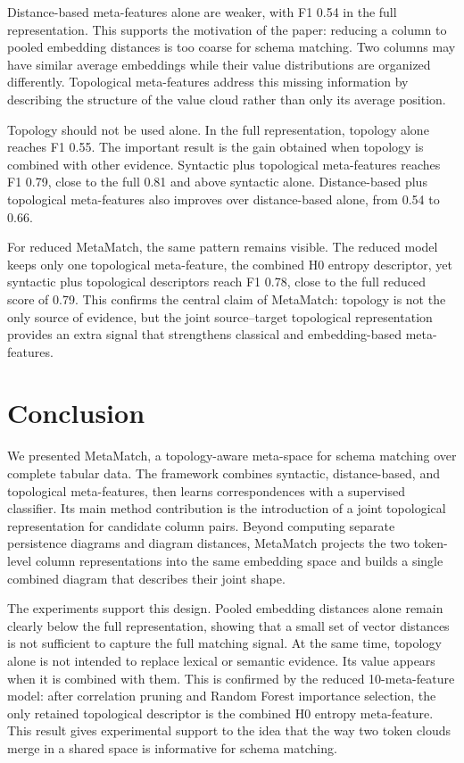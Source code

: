 \documentclass[sigconf, nonacm]{acmart}
\begin{document}
Distance-based meta-features alone are weaker, with F1 0.54 in the full representation. This supports the motivation of the paper: reducing a column to pooled embedding distances is too coarse for schema matching. Two columns may have similar average embeddings while their value distributions are organized differently. Topological meta-features address this missing information by describing the structure of the value cloud rather than only its average position.

Topology should not be used alone. In the full representation, topology alone reaches F1 0.55. The important result is the gain obtained when topology is combined with other evidence. Syntactic plus topological meta-features reaches F1 0.79, close to the full 0.81 and above syntactic alone. Distance-based plus topological meta-features also improves over distance-based alone, from 0.54 to 0.66.

For reduced MetaMatch, the same pattern remains visible. The reduced model keeps only one topological meta-feature, the combined H0 entropy descriptor, yet syntactic plus topological descriptors reach F1 0.78, close to the full reduced score of 0.79. This confirms the central claim of MetaMatch: topology is not the only source of evidence, but the joint source--target topological representation provides an extra signal that strengthens classical and embedding-based meta-features.

\section{Conclusion}
\label{sec:conclusion}

We presented MetaMatch, a topology-aware meta-space for schema matching over complete tabular data. The framework combines syntactic, distance-based, and topological meta-features, then learns correspondences with a supervised classifier. Its main method contribution is the introduction of a joint topological representation for candidate column pairs. Beyond computing separate persistence diagrams and diagram distances, MetaMatch projects the two token-level column representations into the same embedding space and builds a single combined diagram that describes their joint shape.

The experiments support this design. Pooled embedding distances alone remain clearly below the full representation, showing that a small set of vector distances is not sufficient to capture the full matching signal. At the same time, topology alone is not intended to replace lexical or semantic evidence. Its value appears when it is combined with them. This is confirmed by the reduced 10-meta-feature model: after correlation pruning and Random Forest importance selection, the only retained topological descriptor is the combined H0 entropy meta-feature. This result gives experimental support to the idea that the way two token clouds merge in a shared space is informative for schema matching.
\end{document}
